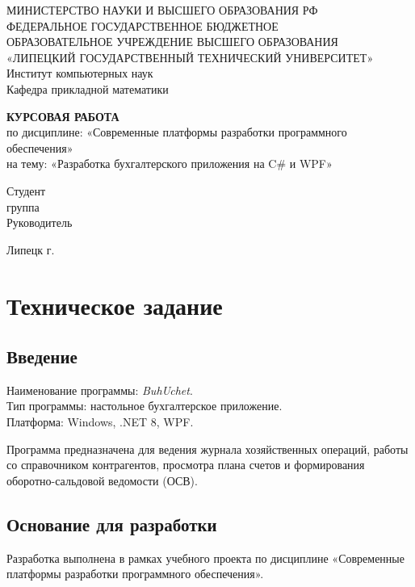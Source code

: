 \documentclass[14pt,a4paper]{extarticle}
\begin{document}
\begin{center}
МИНИСТЕРСТВО НАУКИ И ВЫСШЕГО ОБРАЗОВАНИЯ РФ\\
ФЕДЕРАЛЬНОЕ ГОСУДАРСТВЕННОЕ БЮДЖЕТНОЕ\\
ОБРАЗОВАТЕЛЬНОЕ УЧРЕЖДЕНИЕ ВЫСШЕГО ОБРАЗОВАНИЯ\\
«ЛИПЕЦКИЙ ГОСУДАРСТВЕННЫЙ ТЕХНИЧЕСКИЙ УНИВЕРСИТЕТ»\\
\vspace{0.5cm}
Институт компьютерных наук\\
Кафедра прикладной математики
\vspace{2cm}

\textbf{КУРСОВАЯ РАБОТА}\\
по дисциплине: «Современные платформы разработки программного обеспечения»\\
на тему: «Разработка бухгалтерского приложения на C\# и WPF»
\vspace{2.5cm}

\begin{flushright}
Студент \underline{\hspace{4cm}} \\
группа \underline{\hspace{3cm}} \\
\vspace{0.5cm}
Руководитель \underline{\hspace{4cm}}
\end{flushright}

\vfill
Липецк \the\year{} г.
\end{center}

\newpage
\tableofcontents
\newpage

\section{Техническое задание}

\subsection{Введение}
Наименование программы: \textit{BuhUchet}.\\
Тип программы: настольное бухгалтерское приложение.\\
Платформа: Windows, .NET 8, WPF.

Программа предназначена для ведения журнала хозяйственных операций, работы со справочником контрагентов, просмотра плана счетов и формирования оборотно-сальдовой ведомости (ОСВ).

\subsection{Основание для разработки}
Разработка выполнена в рамках учебного проекта по дисциплине «Современные платформы разработки программного обеспечения».
\end{document}
